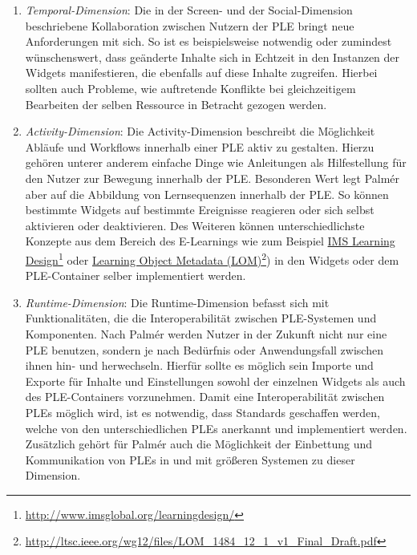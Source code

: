 \begin{enumerate}
 \item \emph{Temporal-Dimension}: Die in der Screen- und der Social-Dimension beschriebene Kollaboration zwischen Nutzern der PLE bringt neue Anforderungen mit sich. So ist es beispielsweise notwendig oder zumindest wünschenswert, dass geänderte Inhalte sich in Echtzeit in den Instanzen der Widgets manifestieren, die ebenfalls auf diese Inhalte zugreifen. Hierbei sollten auch Probleme, wie auftretende Konflikte bei gleichzeitigem Bearbeiten der selben Ressource in Betracht gezogen werden.
 \item \emph{Activity-Dimension}: Die Activity-Dimension beschreibt die Möglichkeit Abläufe und Workflows innerhalb einer PLE aktiv zu gestalten. Hierzu gehören unterer anderem einfache Dinge wie Anleitungen als Hilfestellung für den Nutzer zur Bewegung innerhalb der PLE. Besonderen Wert legt Palmér aber auf die Abbildung von Lernsequenzen innerhalb der PLE. So können bestimmte Widgets auf bestimmte Ereignisse reagieren oder sich selbst aktivieren oder deaktivieren. Des Weiteren können unterschiedlichste Konzepte aus dem Bereich des E-Learnings wie zum Beispiel \href{http://www.imsglobal.org/learningdesign/}{IMS Learning Design}\footnote{\url{http://www.imsglobal.org/learningdesign/}} oder \href{http://ltsc.ieee.org/wg12/files/LOM_1484_12_1_v1_Final_Draft.pdf}{Learning Object Metadata (LOM)}\footnote{\url{http://ltsc.ieee.org/wg12/files/LOM_1484_12_1_v1_Final_Draft.pdf}}) in den Widgets oder dem PLE-Container selber implementiert werden.
 \item \emph{Runtime-Dimension}: Die Runtime-Dimension befasst sich mit Funktionalitäten, die die Interoperabilität zwischen PLE-Systemen und Komponenten. Nach Palmér werden Nutzer in der Zukunft nicht nur eine PLE benutzen, sondern je nach Bedürfnis oder Anwendungsfall zwischen ihnen hin- und herwechseln. Hierfür sollte es möglich sein Importe und Exporte für Inhalte und Einstellungen sowohl der einzelnen Widgets als auch des PLE-Containers vorzunehmen. Damit eine Interoperabilität
 zwischen PLEs möglich wird, ist es notwendig, dass Standards geschaffen werden, welche von den unterschiedlichen PLEs anerkannt und implementiert werden. Zusätzlich gehört für Palmér auch die Möglichkeit der Einbettung und Kommunikation von PLEs in und mit größeren Systemen zu dieser Dimension.
\end{enumerate}

